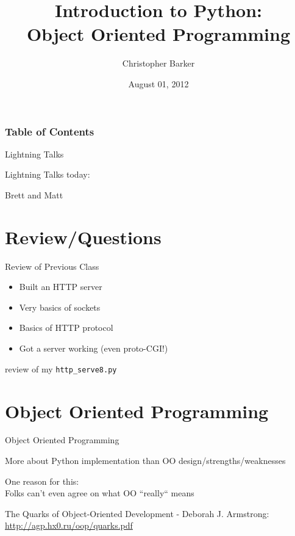 \documentclass{beamer}
\title[Intro to Python: Week 6]{Introduction  to Python:\\Object Oriented Programming}
\author{Christopher Barker}
\institute{UW Continuing Education / Isilon}
\date{August 01, 2012}
\begin{document}
\begin{frame}
  \titlepage
\end{frame}

\begin{frame}
\frametitle{Table of Contents}
  \tableofcontents
\end{frame}

\begin{frame}{Lightning Talks}

{\centering

\vfill
{\LARGE Lightning Talks today:  }

\vfill
{\Huge Brett and Matt}

\vfill
}
\end{frame}


\section{Review/Questions}

\begin{frame}[fragile]{Review of Previous Class}

\begin{itemize}
  \item Built an HTTP server
  \item Very basics of sockets
  \item Basics of HTTP protocol
  \item Got a server working (even proto-CGI!)
\end{itemize}
\vfill
review of my \verb|http_serve8.py|
\end{frame}


\section{Object Oriented Programming}

\begin{frame}[fragile]{Object Oriented Programming}

\vfill
 {\Large More about Python implementation than OO design/strengths/weaknesses}

\vfill
{\Large One reason for this:\\
Folks can't even agree on what OO ``really`` means}

\vfill
The Quarks of Object-Oriented Development - Deborah J. Armstrong:\\
\url{http://agp.hx0.ru/oop/quarks.pdf}

\end{frame} 
\end{document}
